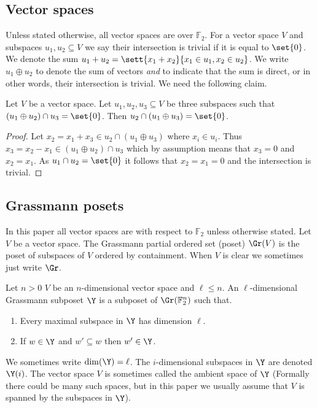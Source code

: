 \subsection{Vector spaces} \label{sec:vec-spaces-defs}
Unless stated otherwise, all vector spaces are over \(\mathbb{F}_2\). For a vector space \(V\) and subspaces \(u_1,u_2 \subseteq V\) we say their intersection is trivial if it is equal to \(\set{0}\). We denote the sum \(u_1 + u_2 = \sett{x_1+x_2}{x_1 \in u_1, x_2 \in u_2}\). We write \(u_1 \oplus u_2\) to denote the sum of vectors \emph{and} to indicate that the sum is direct, or in other words, their intersection is trivial. We need the following claim.
    \begin{claim}\label{claim:basic-three-spaces}
        Let \(V\) be a vector space. Let \(u_1,u_2,u_3 \subseteq V\) be three subspaces such that \((u_1 \oplus u_2) \cap u_3 = \set{0}\). Then \(u_2 \cap (u_1 \oplus u_3) = \set{0}\).
    \end{claim}
    \begin{proof}
        Let \(x_2 = x_1 + x_3 \in u_2 \cap (u_1 \oplus u_3)\) where \(x_i \in u_i\). Thus \(x_3 = x_2-x_1 \in (u_1 \oplus u_2) \cap u_3\) which by assumption means that \(x_3=0\) and \(x_2=x_1\). As \(u_1 \cap u_2 = \set{0}\) it follows that \(x_2=x_1=0\) and the intersection is trivial. 
    \end{proof}
    
\subsection{Grassmann posets} \label{sec:prelims-Grassmann}
In this paper all vector spaces are with respect to \(\mathbb{F}_2\) unless otherwise stated. Let \(V\) be a vector space. The Grassmann partial ordered set (poset) \(\Gr(V)\) is the poset of subspaces of \(V\) ordered by containment. When \(V\) is clear we sometimes just write \(\Gr\).
\begin{definition} \label{def:grass-sbpt}
    Let \(n > 0\) \(V\) be an \(n\)-dimensional vector space and \(\ell \leq n\). An \(\ell\)-dimensional Grassmann subposet \(\Y\) is a subposet of \(\Gr(\mathbb{F}_2^n)\) such that.
\begin{enumerate}
    \item Every maximal subspace in \(\Y\) has dimension \(\ell\).
    \item If \(w \in \Y\) and \(w' \subseteq w\) then \(w' \in \Y\).
\end{enumerate}
\end{definition}
We sometimes write \(\dim(\Y) = \ell\). The \(i\)-dimensional subspaces in \(\Y\) are denoted \(\Y(i)\). The vector space \(V\) is sometimes called the ambient space of \(\Y\) (Formally there could be many such spaces, but in this paper we usually assume that \(V\) is spanned by the subspaces in \(\Y\)).

